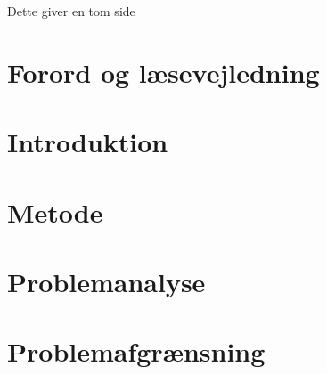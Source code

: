 
\raggedbottom





\frontmatter

\clearpage
\thispagestyle{empty}
{\color{white}Dette giver en tom side}
\clearpage


%
\chapter*{Forord og læsevejledning}\vspace{-.75cm}

\newpage


\tableofcontents* 

\mainmatter

\chapter{Introduktion}\vspace{-.75cm} \label{introduktion}


\chapter{Metode}\vspace{-.75cm}


\chapter{Problemanalyse}\vspace{-.75cm} \label{problemanalysen}





\chapter{Problemafgrænsning}\vspace{-.75cm}


